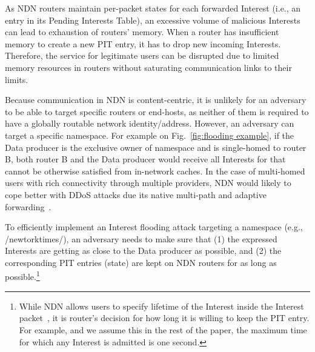 As NDN routers maintain per-packet states for each forwarded Interest (i.e., an entry in its Pending Interests Table), an excessive volume of malicious Interests can lead to exhaustion of routers' memory. When a router has insufficient memory to create a new PIT entry, it has to drop new incoming Interests.
Therefore, the service for legitimate users can be disrupted due to limited memory resources in routers without saturating communication links to their limits.


Because communication in NDN is content-centric, it is unlikely for an adversary to be able to target specific routers or end-hosts, as neither of them is required to have a globally routable network identity/address. However, an adversary can target a specific namespace.
For example on Fig.~\ref{fig:flooding example}, if the Data producer is the exclusive owner of  namespace and is single-homed to router B, both router B and the Data producer would receive all Interests for  that cannot be otherwise satisfied from in-network caches. In the case of multi-homed users with rich connectivity through multiple providers, NDN would likely to cope better with DDoS attacks due its native multi-path and adaptive forwarding~\cite{adaptive-forwarding}.



To efficiently implement an Interest flooding attack targeting a namespace (e.g., /newtorktimes/), an adversary needs to make sure that (1) the expressed Interests are getting as close to the Data producer as possible, and (2) the corresponding PIT entries (state) are kept on NDN routers for as long as possible.\footnote{While NDN allows users to specify lifetime of the Interest inside the Interest packet~\cite{ndn-conext,ndn-tr}, it is router's decision for how long it is willing to keep the PIT entry.  For example, and we assume this in the rest of the paper, the maximum time for which any Interest is admitted is one second.}

